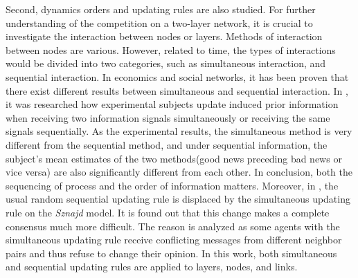 Second, dynamics orders and updating rules are also studied. For further understanding of the competition on a two-layer network, it is crucial to investigate the interaction between nodes or layers. Methods of interaction between nodes are various. However, related to time, the types of interactions would be divided into two categories, such as simultaneous interaction, and sequential interaction.\parencite{sirbu2017} In economics and social networks, it has been proven that there exist different results between simultaneous and sequential interaction.\parencite{hoffman2011, dietrich2004} In \parencite{hoffman2011}, it was researched how experimental subjects update induced prior information when receiving two information signals simultaneously or receiving the same signals sequentially. As the experimental results, the simultaneous method is very different from the sequential method, and under sequential information, the subject’s mean estimates of the two methods(good news preceding bad news or vice versa) are also significantly different from each other. In conclusion, both the sequencing of process and the order of information matters. Moreover, in \parencite{dietrich2004}, the usual random sequential updating rule is displaced by the simultaneous updating rule on the \textit{Sznajd} model. It is found out that this change makes a complete consensus much more difficult. The reason is analyzed as some agents with the simultaneous updating rule receive conflicting messages from different neighbor pairs and thus refuse to change their opinion. In this work, both simultaneous and sequential updating rules are applied to layers, nodes, and links.

